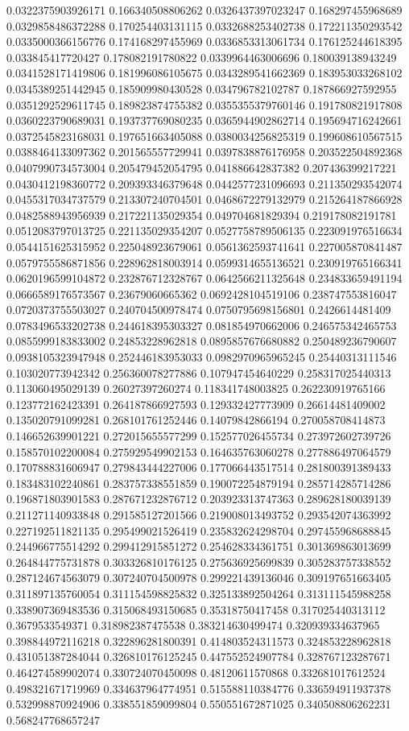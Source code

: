 \begin{table}
\begin{tabu}
\begin{sparkline}{10}
0.0322375903926171 0.166340508806262 0.0326437397023247 0.168297455968689 0.0329858486372288 0.170254403131115 0.0332688253402738 0.172211350293542 0.0335000366156776 0.174168297455969 0.0336853313061734 0.176125244618395 0.033845417720427 0.178082191780822 0.0339964463006696 0.180039138943249 0.0341528171419806 0.181996086105675 0.0343289541662369 0.183953033268102 0.0345389251442945 0.185909980430528 0.034796782102787 0.187866927592955 0.0351292529611745 0.189823874755382 0.0355355379760146 0.191780821917808 0.0360223790689031 0.193737769080235 0.0365944902862714 0.195694716242661 0.0372545823168031 0.197651663405088 0.0380034256825319 0.199608610567515 0.0388464133097362 0.201565557729941 0.0397838876176958 0.203522504892368 0.0407990734573004 0.205479452054795 0.041886642837382 0.207436399217221 0.0430412198360772 0.209393346379648 0.0442577231096693 0.211350293542074 0.0455317034737579 0.213307240704501 0.0468672279132979 0.215264187866928 0.0482588943956939 0.217221135029354 0.049704681829394 0.219178082191781 0.0512083797013725 0.221135029354207 0.0527758789506135 0.223091976516634 0.0544151625315952 0.225048923679061 0.0561362593741641 0.227005870841487 0.0579755586871856 0.228962818003914 0.0599314655136521 0.230919765166341 0.0620196599104872 0.232876712328767 0.0642566211325648 0.234833659491194 0.0666589176573567 0.23679060665362 0.0692428104519106 0.238747553816047 0.0720373755503027 0.240704500978474 0.0750795698156801 0.2426614481409 0.0783496533202738 0.244618395303327 0.081854970662006 0.246575342465753 0.0855999183833002 0.24853228962818 0.0895857676680882 0.250489236790607 0.0938105323947948 0.252446183953033 0.0982970965965245 0.25440313111546 0.103020773942342 0.256360078277886 0.107947454640229 0.258317025440313 0.113060495029139 0.26027397260274 0.118341748003825 0.262230919765166 0.123772162423391 0.264187866927593 0.129332427773909 0.26614481409002 0.135020791099281 0.268101761252446 0.14079842866194 0.270058708414873 0.146652639901221 0.272015655577299 0.152577026455734 0.273972602739726 0.158570102200084 0.275929549902153 0.164635763060278 0.277886497064579 0.170788831606947 0.279843444227006 0.177066443517514 0.281800391389433 0.183483102240861 0.283757338551859 0.190072254879194 0.285714285714286 0.196871803901583 0.287671232876712 0.203923313747363 0.289628180039139 0.211271140933848 0.291585127201566 0.219008013493752 0.293542074363992 0.227192511821135 0.295499021526419 0.235832624298704 0.297455968688845 0.244966775514292 0.299412915851272 0.254628334361751 0.301369863013699 0.264844775731878 0.303326810176125 0.275636925699839 0.305283757338552 0.287124674563079 0.307240704500978 0.299221439136046 0.309197651663405 0.311897135760054 0.311154598825832 0.325133892504264 0.313111545988258 0.338907369483536 0.315068493150685 0.35318750417458 0.317025440313112 0.3679533549371 0.318982387475538 0.383214630499474 0.320939334637965 0.398844972116218 0.322896281800391 0.414803524311573 0.324853228962818 0.431051387284044 0.326810176125245 0.447552524907784 0.328767123287671 0.464274589902074 0.330724070450098 0.48120611570868 0.332681017612524 0.498321671719969 0.334637964774951 0.515588110384776 0.336594911937378 0.532998870924906 0.338551859099804 0.550551672871025 0.340508806262231 0.568247768657247 
\end{sparkline}
\end{tabu}
\end{table}

